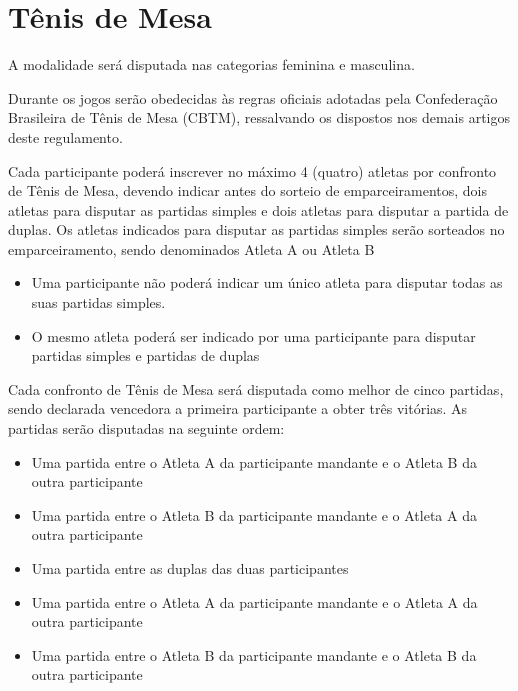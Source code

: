 {\let\clearpage\relax \chapter{Tênis de Mesa}}

\begin{article}
	A modalidade será disputada nas categorias feminina e masculina.
\end{article}

\begin{article}
	Durante os jogos serão obedecidas às regras oficiais adotadas pela Confederação Brasileira de Tênis de Mesa (CBTM), ressalvando os dispostos nos demais artigos deste regulamento.
\end{article}

\begin{article}
	Cada participante poderá inscrever no máximo 4 (quatro) atletas por confronto de Tênis de Mesa, devendo indicar antes do sorteio de emparceiramentos, dois atletas para disputar as partidas simples e dois atletas para disputar a partida de duplas. Os atletas indicados para disputar as partidas simples serão sorteados no emparceiramento, sendo denominados Atleta A ou Atleta B

	\begin{itemize}[noitemsep]
		\item Uma participante não poderá indicar um único atleta para disputar todas as suas partidas simples.
		\item O mesmo atleta poderá ser indicado por uma participante para disputar partidas simples e partidas de duplas
	\end{itemize}
\end{article}

\noindent
Cada confronto de Tênis de Mesa será disputada como melhor de cinco partidas, sendo declarada vencedora a primeira participante a obter três vitórias. As partidas serão disputadas na seguinte ordem:
\begin{itemize}[noitemsep]
	\item Uma partida entre o Atleta A da participante mandante e o Atleta B da outra participante
	\item Uma partida entre o Atleta B da participante mandante e o Atleta A da outra participante
	\item Uma partida entre as duplas das duas participantes
	\item Uma partida entre o Atleta A da participante mandante e o Atleta A da outra participante
	\item Uma partida entre o Atleta B da participante mandante e o Atleta B da outra participante
\end{itemize}


